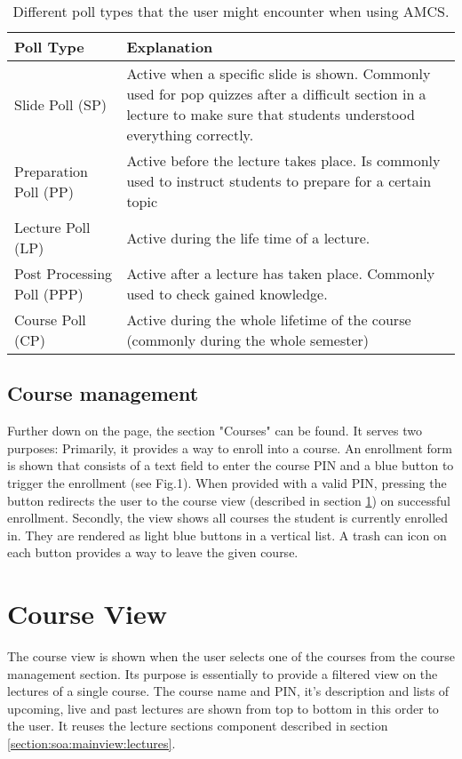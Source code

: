 \begin{table}[t]
	{\renewcommand{\arraystretch}{2}
		\begin{tabular}{ | p{3cm} | p{12cm} |}
			\hline
			Poll Type & Explanation \\ \hline \hline
			Slide Poll (SP) & Active when a specific slide is shown. Commonly used for pop quizzes after a difficult section in a lecture to make sure that students understood everything correctly. \\ \hline
			Preparation Poll (PP) & Active before the lecture takes place. Is commonly used to instruct students to prepare for a certain topic \\ \hline
			Lecture Poll (LP) & Active during the life time of a lecture. \\ \hline
			Post Processing Poll (PPP) & Active after a lecture has taken place. Commonly used to check gained knowledge. \\ \hline
			Course Poll (CP) & Active during the whole lifetime of the course (commonly during the whole semester) \\
			\hline
		\end{tabular}
	}
	\caption{Different poll types that the user might encounter when using AMCS.}
	\label{tab:pollTypes}
\end{table}

\subsection{Course management}

Further down on the page, the section "Courses" can be found. It serves two purposes: Primarily, it provides a way to enroll into a course. An enrollment form is shown that consists of a text field to enter the course PIN and a blue button to trigger the enrollment (see Fig.1). When provided with a valid PIN, pressing the button redirects the user to the course view (described in section \ref{section:soa:courseview})  on successful enrollment.
Secondly, the view shows all courses the student is currently enrolled in. They are rendered as light blue buttons in a vertical list. A trash can icon on each button provides a way to leave the given course.

\section{Course View}
\label{section:soa:courseview}

The course view is shown when the user selects one of the courses from the course management section. Its purpose is essentially to provide a filtered view on the lectures of a single course.
The course name and PIN, it's description and lists of upcoming, live and past lectures are shown from top to bottom in this order to the user. It reuses the lecture sections component described in section \ref{section:soa:mainview:lectures}.


